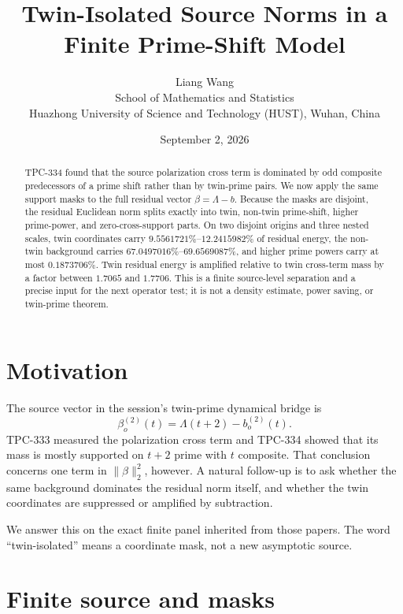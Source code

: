 \documentclass[10pt]{article}
\title{Twin-Isolated Source Norms in a Finite Prime-Shift Model}
\author{Liang Wang\\School of Mathematics and Statistics\\
Huazhong University of Science and Technology (HUST), Wuhan, China}
\date{September 2, 2026}
\begin{document}
\maketitle

\begin{abstract}
TPC-334 found that the source polarization cross term is dominated by odd
composite predecessors of a prime shift rather than by twin-prime pairs.  We
now apply the same support masks to the full residual vector
$\beta=\Lambda-b$.  Because the masks are disjoint, the residual Euclidean
norm splits exactly into twin, non-twin prime-shift, higher prime-power, and
zero-cross-support parts.  On two disjoint origins and three nested scales,
twin coordinates carry $9.5561721\%$--$12.2415982\%$ of residual energy, the
non-twin background carries $67.0497016\%$--$69.6569087\%$, and higher
prime powers carry at most $0.1873706\%$.  Twin residual energy is amplified
relative to twin cross-term mass by a factor between $1.7065$ and $1.7706$.
This is a finite source-level separation and a precise input for the next
operator test; it is not a density estimate, power saving, or twin-prime
theorem.
\end{abstract}

\section{Motivation}

The source vector in the session's twin-prime dynamical bridge is
\[
 \beta_o^{(2)}(t)=\Lambda(t+2)-b_o^{(2)}(t).
\]
TPC-333 measured the polarization cross term and TPC-334 showed that its mass
is mostly supported on $t+2$ prime with $t$ composite.  That conclusion
concerns one term in $\|\beta\|_2^2$, however.  A natural follow-up is to ask
whether the same background dominates the residual norm itself, and whether
the twin coordinates are suppressed or amplified by subtraction.

We answer this on the exact finite panel inherited from those papers.  The
word ``twin-isolated'' means a coordinate mask, not a new asymptotic source.

\section{Finite source and masks}
\end{document}
